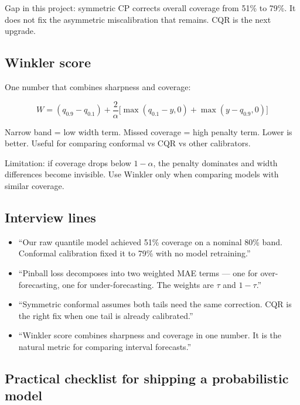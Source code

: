 Gap in this project: symmetric CP corrects overall coverage from 51\% to 79\%.
It does not fix the asymmetric miscalibration that remains.
CQR is the next upgrade.

\subsection{Winkler score}

One number that combines sharpness and coverage:

\[
  W = (q_{0.9} - q_{0.1}) + \frac{2}{\alpha}
      \bigl[\max(q_{0.1}-y,0) + \max(y-q_{0.9},0)\bigr]
\]

Narrow band = low width term.
Missed coverage = high penalty term.
Lower is better. Useful for comparing conformal vs CQR vs other calibrators.

Limitation: if coverage drops below $1-\alpha$, the penalty
dominates and width differences become invisible.
Use Winkler only when comparing models with similar coverage.

\subsection{Interview lines}

\begin{itemize}
  \item ``Our raw quantile model achieved 51\% coverage on a nominal 80\% band.
        Conformal calibration fixed it to 79\% with no model retraining.''
  \item ``Pinball loss decomposes into two weighted MAE terms — one for
        over-forecasting, one for under-forecasting. The weights are $\tau$
        and $1-\tau$.''
  \item ``Symmetric conformal assumes both tails need the same correction.
        CQR is the right fix when one tail is already calibrated.''
  \item ``Winkler score combines sharpness and coverage in one number.
        It is the natural metric for comparing interval forecasts.''
\end{itemize}

\subsection{Practical checklist for shipping a probabilistic model}

